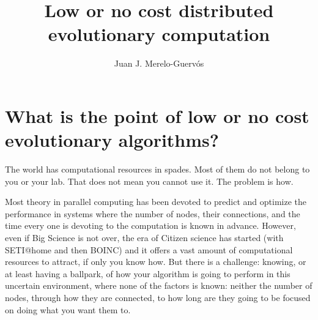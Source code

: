 \documentclass{svmult}
\begin{document}
\title*{Low or no cost distributed evolutionary computation}
\author{Juan J. Merelo-Guervós}


\maketitle


\section{What is the point of low or no cost evolutionary algorithms?}

The world has computational resources in spades. Most of them do not belong to you or your lab. That does not mean you cannot use it. The problem is how.

Most theory in parallel computing has been devoted to predict and optimize the performance in systems where the number of nodes, their connections, and the time every one is devoting to the computation is known in advance. However, even if Big Science is not over, the era of Citizen science has started (with SETI@home and then BOINC) and it offers a vast amount of computational resources to attract, if only you know how. But there is a challenge: knowing, or at least having a ballpark, of how your algorithm is going to perform in this uncertain environment, where none of the factors is known: neither the number of nodes, through how they are connected, to how long are they going to be focused on doing what you want them to.
\end{document}
